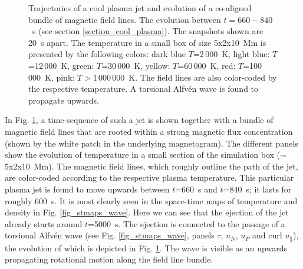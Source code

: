 \documentclass{aa}
\begin{document}
{\begin{figure}[!h]
\begin{minipage}{12cm}
\end{minipage}
\caption{{Trajectories of a cool plasma jet and evolution of a co-aligned bundle of magnetic field lines. The evolution between $t=660-840$~s (see section \ref{section_cool_plasma}). The snapshots shown are 20~s apart. The temperature in a small box of size 5x2x10~Mm is presented by the following colors: dark blue $T$=2\,000~K, light blue: $T$=12\,000~K, green: $T$=30\,000~K, yellow: $T$=60\,000~K, red: $T$=100\,000~K, pink: $T>$1\,000\,000~K. The field lines are also color-coded by the respective temperature. %
A torsional Alfv\'en wave is found to propagate upwards.\label{fig_ejection}}}
\end{figure}




In Fig. \ref{fig_ejection}, a time-sequence of such a jet is shown together with a bundle of magnetic field lines that are rooted within a strong magnetic flux concentration (shown by the white patch in the underlying magnetogram). The different panels show the evolution of temperature in a small section of the simulation box ($\sim$5x2x10~Mm). The magnetic field lines, which roughly outline the path of the jet, are color-coded according to the respective plasma temperature. This particular plasma jet is found to move upwards between $t$=660~s and $t$=840~s; it lasts for roughly 600~s. %
 It is most clearly seen in the space-time maps of temperature and density in Fig. \ref{fig_stmaps_wave}. {\color{blue} Here we can see that the ejection of the jet already starts around $t$=5000~s.} 
The ejection is connected to the passage of a torsional Alfv\'en wave (see Fig. \ref{fig_stmaps_wave}, panels $\tau$, $u_N$, $u_P$ and curl $u_{\parallel}$), the evolution of which is depicted in Fig. \ref{fig_ejection}.
 The wave is visible as an upwards propagating rotational motion along the field line bundle. %

}
\end{document}
